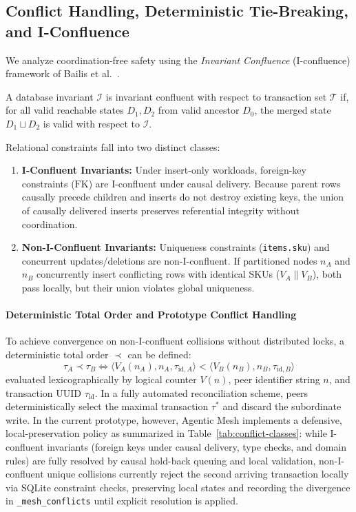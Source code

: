 \subsection{Conflict Handling, Deterministic Tie-Breaking, and I-Confluence}
\label{sec:conflict}

We analyze coordination-free safety using the \textit{Invariant Confluence} (I-confluence) framework of Bailis et al.~\cite{bailis2014coordination}.

\begin{definition}
A database invariant $\mathcal{I}$ is invariant confluent with respect to transaction set $\mathcal{T}$ if, for all valid reachable states $D_1, D_2$ from valid ancestor $D_0$, the merged state $D_1 \sqcup D_2$ is valid with respect to $\mathcal{I}$.
\end{definition}

Relational constraints fall into two distinct classes:
\begin{enumerate}
    \item \textbf{I-Confluent Invariants:} Under insert-only workloads, foreign-key constraints ($\text{FK}$) are I-confluent under causal delivery. Because parent rows causally precede children and inserts do not destroy existing keys, the union of causally delivered inserts preserves referential integrity without coordination.
    \item \textbf{Non-I-Confluent Invariants:} Uniqueness constraints (\texttt{items.sku}) and concurrent updates/deletions are non-I-confluent. If partitioned nodes $n_A$ and $n_B$ concurrently insert conflicting rows with identical SKUs ($V_A \parallel V_B$), both pass locally, but their union violates global uniqueness.
\end{enumerate}

\paragraph{Deterministic Total Order and Prototype Conflict Handling}
To achieve convergence on non-I-confluent collisions without distributed locks, a deterministic total order $\prec$ can be defined:
\begin{equation}
\label{eq:tie_break}
\tau_A \prec \tau_B \iff \langle V_A(n_A), n_A, \tau_{\text{id},A} \rangle < \langle V_B(n_B), n_B, \tau_{\text{id},B} \rangle
\end{equation}
evaluated lexicographically by logical counter $V(n)$, peer identifier string $n$, and transaction UUID $\tau_{\text{id}}$. In a fully automated reconciliation scheme, peers deterministically select the maximal transaction $\tau^*$ and discard the subordinate write. In the current prototype, however, Agentic Mesh implements a defensive, local-preservation policy as summarized in Table~\ref{tab:conflict-classes}: while I-confluent invariants (foreign keys under causal delivery, type checks, and domain rules) are fully resolved by causal hold-back queuing and local validation, non-I-confluent unique collisions currently reject the second arriving transaction locally via SQLite constraint checks, preserving local states and recording the divergence in \texttt{\_mesh\_conflicts} until explicit resolution is applied.

